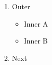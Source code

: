 \documentclass{article}
\begin{document}
\begin{enumerate}
\item Outer
\begin{itemize}
\item Inner A
\item Inner B
\end{itemize}
\item Next
\end{enumerate}
\end{document}
